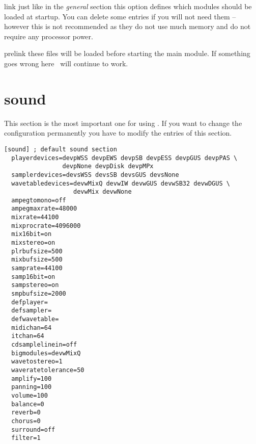 \begin{dojlist}
\item[link] just like in the \emph{general} section this option defines which
modules should be loaded at startup. You can delete some entries if
you will not need them -- however this is not recommended as they do
not use much memory and do not require any processor power.
\item[prelink] these files will be loaded before starting the main module. If
something goes wrong here \cp\ will continue to work.
\end{dojlist}

\section{sound}
This section is the most important one for using \cp. If you want to
change the configuration permanently you have to modify the entries of
this section.

\begin{verbatim}
[sound] ; default sound section
  playerdevices=devpWSS devpEWS devpSB devpESS devpGUS devpPAS \
                devpNone devpDisk devpMPx
  samplerdevices=devsWSS devsSB devsGUS devsNone
  wavetabledevices=devwMixQ devwIW devwGUS devwSB32 devwDGUS \
                   devwMix devwNone
  ampegtomono=off
  ampegmaxrate=48000
  mixrate=44100          
  mixprocrate=4096000   
  mix16bit=on            
  mixstereo=on          
  plrbufsize=500        
  mixbufsize=500        
  samprate=44100        
  samp16bit=on          
  sampstereo=on        
  smpbufsize=2000       
  defplayer=             
  defsampler=            
  defwavetable=        
  midichan=64           
  itchan=64
  cdsamplelinein=off     
  bigmodules=devwMixQ    
  wavetostereo=1         
  waveratetolerance=50  
  amplify=100  
  panning=100 
  volume=100  
  balance=0  
  reverb=0   
  chorus=0    
  surround=off
  filter=1  
\end{verbatim}

